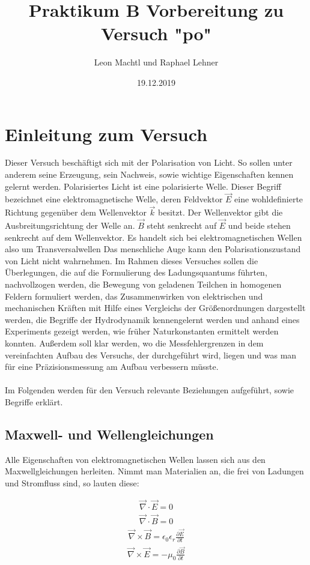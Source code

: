 \documentclass[a4paper,10pt]{scrartcl}
\title{Praktikum B Vorbereitung zu Versuch "po"}
\author{Leon Machtl und Raphael Lehner}
\date{19.12.2019}
\begin{document}
	\maketitle
	\tableofcontents
	\newpage
	
	\section{Einleitung zum Versuch}
		Dieser Versuch beschäftigt sich mit der Polarisation von Licht. So sollen unter anderem seine Erzeugung, sein Nachweis, sowie wichtige Eigenschaften kennen gelernt werden. Polarisiertes Licht ist eine polarisierte Welle. Dieser Begriff bezeichnet eine elektromagnetische Welle, deren Feldvektor \(\vec{E}\) eine wohldefinierte Richtung gegenüber dem Wellenvektor \(\vec{k}\) besitzt. Der Wellenvektor gibt die Ausbreitungsrichtung der Welle an. \(\vec{B}\) steht senkrecht auf \(\vec{E}\) und beide stehen senkrecht auf dem Wellenvektor. Es handelt sich bei elektromagnetischen Wellen also um Transversalwellen Das menschliche Auge kann den Polarisationszustand von Licht nicht wahrnehmen. Im Rahmen dieses Versuches sollen die Überlegungen, die auf die Formulierung des Ladungsquantums führten, nachvollzogen werden, die Bewegung von geladenen Teilchen in homogenen Feldern formuliert werden, das Zusammenwirken von elektrischen und mechanischen Kräften mit Hilfe eines Vergleichs der Größenordnungen dargestellt werden, die Begriffe der Hydrodynamik kennengelernt werden und anhand eines Experiments gezeigt werden, wie früher Naturkonstanten ermittelt werden konnten. Außerdem soll klar werden, wo die Messfehlergrenzen in dem vereinfachten Aufbau des Versuchs, der durchgeführt wird, liegen und was man für eine Präzisionsmessung am Aufbau verbessern müsste.\\
		\\
		Im Folgenden werden für den Versuch relevante Beziehungen aufgeführt, sowie Begriffe erklärt.
		
		\subsection{Maxwell- und Wellengleichungen}
			Alle Eigenschaften von elektromagnetischen Wellen lassen sich aus den Maxwellgleichungen herleiten. Nimmt man Materialien an, die frei von Ladungen und Stromfluss sind, so lauten diese:
			
			\begin{align}
			\vec{\nabla}\cdot\vec{E}=0
			\end{align}
			\begin{align}
			\vec{\nabla}\cdot\vec{B}=0
			\end{align}
			\begin{align}
			\vec{\nabla}\times\vec{B}=\epsilon_{0}\epsilon_{r}\frac{\partial\vec{E}}{\partial t}
			\end{align}
			\begin{align}
			\vec{\nabla}\times\vec{E}=-\mu_{0}\frac{\partial\vec{B}}{\partial t}
			\end{align}
			
\end{document}
